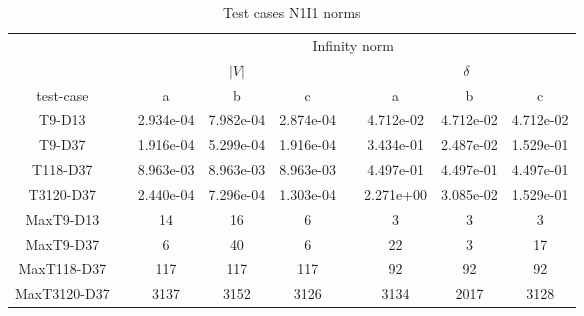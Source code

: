 \begin{table}
\renewcommand{\arraystretch}{1.3}
\centering
\label{}\hspace{2cm}\caption{Test cases N1I1 norms}
\begin{adjustbox}{width=1\textwidth} %
\small
\begin{tabular}{ccccccccc}
\toprule
{} && \multicolumn{7}{c}{Infinity norm}   \\
\cmidrule{3-9}
{} && \multicolumn{3}{c}{$|V|$} && \multicolumn{3}{c}{$\delta$}  \\
\cmidrule{3-5}\cmidrule{7-9}
 test-case &&        a &        b &       c &&        a &       b &        c \\
\midrule
T9-D13       &&  2.934e-04 &  7.982e-04 &  2.874e-04 &&  4.712e-02 &  4.712e-02 &  4.712e-02 \\
T9-D37       &&  1.916e-04 &  5.299e-04 &  1.916e-04 &&  3.434e-01 &  2.487e-02 &  1.529e-01 \\
T118-D37     &&  8.963e-03 &  8.963e-03 &  8.963e-03 &&  4.497e-01 &  4.497e-01 &  4.497e-01 \\
T3120-D37    &&  2.440e-04 &  7.296e-04 &  1.303e-04 &&  2.271e+00 &  3.085e-02 &  1.529e-01 \\
MaxT9-D13    &&         14 &         16 &          6 &&          3 &          3 &          3 \\
MaxT9-D37    &&          6 &         40 &          6 &&         22 &          3 &         17 \\
MaxT118-D37  &&        117 &        117 &        117 &&         92 &         92 &         92 \\
MaxT3120-D37 &&       3137 &       3152 &       3126 &&       3134 &       2017 &       3128 \\
\bottomrule
\end{tabular}
\end{adjustbox}
\end{table}